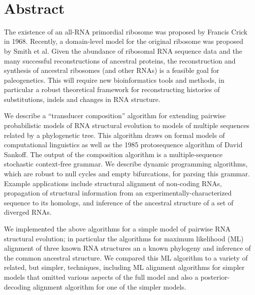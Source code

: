 \documentclass[10pt]{article}
\date{}
\begin{document}
\begin{flushleft}
  {\Large
    \textbf{\titlestring}
  }
\\
\authorstring
\end{flushleft}


\newpage
\section*{Abstract}
The existence of an all-RNA primordial ribosome was proposed by
Francis Crick in 1968.  Recently, a domain-level model for the
original ribosome was proposed by Smith et al.  Given the abundance of
ribosomal RNA sequence data and the many successful reconstructions of
ancestral proteins, the reconstruction and synthesis of ancestral
ribosomes (and other RNAs) is a feasible goal for paleogenetics.  This
will require new bioinformatics tools and methods, in particular a
robust theoretical framework for reconstructing histories of
substitutions, indels and changes in RNA structure.

We describe a ``transducer composition'' algorithm for extending
pairwise probabilistic models of RNA structural evolution to models of
multiple sequences related by a phylogenetic tree.  This algorithm
draws on formal models of computational linguistics as well as the
1985 protosequence algorithm of David Sankoff.  The output of the
composition algorithm is a multiple-sequence stochastic context-free
grammar.  We describe dynamic programming algorithms, which are robust
to null cycles and empty bifurcations, for parsing this grammar.
Example applications include structural alignment of non-coding RNAs,
propagation of structural information from an
experimentally-characterized sequence to its homologs, and inference
of the ancestral structure of a set of diverged RNAs.

We implemented the above algorithms for a simple model of pairwise RNA structural evolution;
in particular the algorithms for maximum likelihood (ML) alignment of three known RNA structures an a known phylogeny
and inference of the common ancestral structure.
We compared this ML algorithm to a variety of related, but simpler, techniques,
including ML alignment algorithms for simpler models that omitted various aspects of the full model
and also a posterior-decoding alignment algorithm for one of the simpler models.
\end{document}
